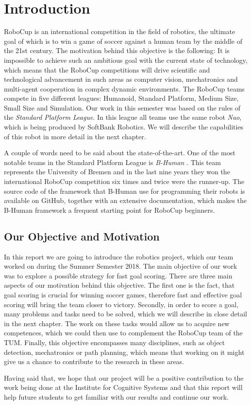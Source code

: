 \chapter{Introduction}

RoboCup \cite{robocup} is an international competition in the field of
robotics, the ultimate goal of which is to win a game of soccer against a human
team by the middle of the 21st century. The motivation behind this objective is
the following: It is impossible to achieve such an ambitious goal with the
current state of technology, which means that the RoboCup competitions will
drive scientific and technological advancement in such areas as computer
vision, mechatronics and multi-agent cooperation in complex dynamic
environments. The RoboCup teams compete in five different leagues: Humanoid,
Standard Platform, Medium Size, Small Size and Simulation. Our work in this
semester was based on the rules of the \textit{Standard Platform League}. In
this league all teams use the same robot \textit{Nao}, which is being produced
by SoftBank Robotics. We will describe the capabilities of this robot in
more detail in the next chapter.

A couple of words need to be said about the state-of-the-art. One of the most
notable teams in the Standard Platform League is \textit{B-Human}
\cite{bhuman}. This team represents the University of Bremen and in the last
nine years they won the international RoboCup competition six times and twice
were the runner-up. The source code of the framework that B-Human use for
programming their robots is available on GitHub, together with an extensive
documentation, which makes the B-Human framework a frequent starting point for
RoboCup beginners.

\section{Our Objective and Motivation}
\label{sec problem statement}

In this report we are going to introduce the robotics project, which our team
worked on during the Summer Semester 2018. The main objective of our work was
to explore a possible strategy for fast goal scoring. There are three main
aspects of our motivation behind this objective. The first one is the fact,
that goal scoring is crucial for winning soccer games, therefore fast and
effective goal scoring will bring the team closer to victory. Secondly, in
order to score a goal, many problems and tasks need to be solved, which we will
describe in close detail in the next chapter. The work on these tasks would
allow us to acquire new competences, which we could then use to complement the
RoboCup team of the TUM. Finally, this objective encompasses many disciplines, such
as object detection, mechatronics or path planning, which means that working on
it might give us a chance to contribute to the research in these areas.

Having said that, we hope that our project will be a positive contribution to
the work being done at the Institute for Cognitive Systems and that this
report will help future students to get familiar with our results and continue
our work.
